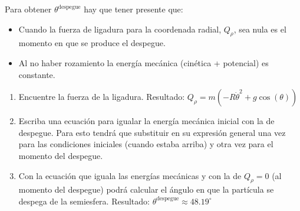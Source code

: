 \documentclass[11pt, spanish, a4paper, twoside]{article}
\begin{document}
\begin{enumerate}
\begin{minipage}[t][4.5cm]{0.62\textwidth}
		Para obtener \(\theta^\mathrm{despegue}\) hay que tener presente que:
		\begin{itemize}
			\item Cuando la fuerza de ligadura para la coordenada radial, \(Q_{\rho}\), sea nula es el momento en que se produce el despegue.
			\item Al no haber rozamiento la energía mecánica (cinética + potencial) es constante.
		\end{itemize}
	\end{minipage}
	\begin{minipage}[c][0cm][t]{0.3\textwidth}
		
	\end{minipage}
	\begin{enumerate}
		\item Encuentre la fuerza de la ligadura. 
		Resultado: \(Q_{\rho} = m \left(- R \dot{\theta}^{2} + g \cos{\left(\theta \right)}\right)\)
		\item Escriba una ecuación para igualar la energía mecánica inicial con la de despegue. Para esto tendrá que substituir en su expresión general una vez para las condiciones iniciales (cuando estaba arriba) y otra vez para el momento del despegue.
		\item Con la ecuación que iguala las energías mecánicas y con la de \(Q_{\rho}= 0\) (al momento del despegue) podrá calcular el ángulo en que la partícula se despega de la semiesfera.
		Resultado: \(\theta^\mathrm{despegue} \approx 48.19^\circ\) 
	\end{enumerate}
%

\end{enumerate}
\end{document}
